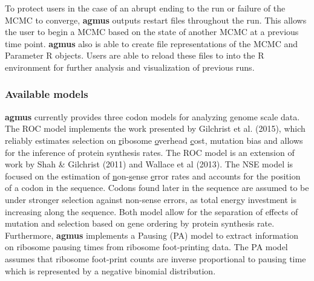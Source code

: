 \documentclass{bioinfo}
\newcommand{\package}{\textbf{agmus }} %
\begin{document}
To protect users in the case of an abrupt ending to the run or failure of the MCMC to converge, \package outputs restart files throughout the run. This allows the user to begin a MCMC based on the state of another MCMC at a previous time point. \package also is able to create file representations of the MCMC and Parameter R objects. Users are able to reload these files to into the R environment for further analysis and visualization of previous runs.
 
 
\subsubsection*{Available models}
\package currently provides three codon models for analyzing genome scale data.
The ROC model implements the work presented by Gilchrist et al. (2015), which reliably estimates selection on \underline{r}ibosome \underline{o}verhead \underline{c}ost, mutation bias and allows for the inference of protein synthesis rates. The ROC model is an extension of work by Shah \& Gilchrist (2011) and  Wallace et al (2013). 
The NSE model is focused on the estimation of \underline{n}on-\underline{s}ense \underline{e}rror rates and accounts for the position of a codon in the sequence. Codons found later in the sequence are assumed to be under stronger selection against non-sense errors, as total energy investment is increasing along the sequence.
Both model allow for the separation of effects of mutation and selection based on gene ordering by protein synthesis rate.
Furthermore, \package implements a Pausing (PA) model to extract information on ribosome pausing times from ribosome foot-printing data. The PA model assumes that ribosome foot-print counts are inverse proportional to pausing time which is represented by a negative binomial distribution. 

\end{document}
